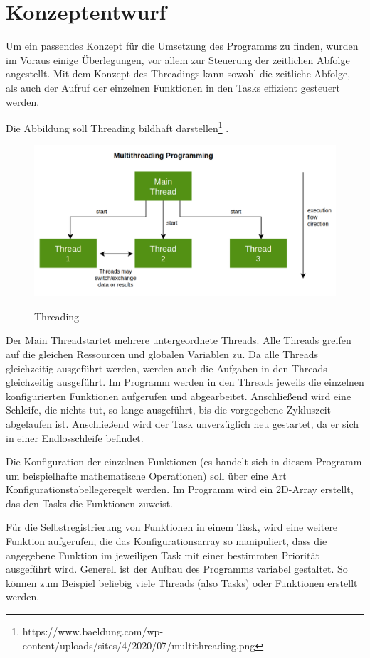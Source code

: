 \chapter{Konzeptentwurf}
\label{cha:Konzeptentwurf}

Um ein passendes Konzept für die Umsetzung des Programms zu finden, wurden im Voraus einige Überlegungen, vor allem zur Steuerung der zeitlichen Abfolge angestellt.
Mit dem Konzept des Threadings kann sowohl die zeitliche Abfolge, als auch der Aufruf der einzelnen Funktionen in den Tasks effizient gesteuert werden. 

Die Abbildung  soll Threading bildhaft darstellen\footnote[1]{https://www.baeldung.com/wp-content/uploads/sites/4/2020/07/multithreading.png}	.

\begin{figure}[hbt]				%
	\centering						%
	\includegraphics[width=0.6\linewidth]{images/multithreading}	
	\label{fig:multithreading}
	\caption{Threading}
	{\raggedright
	 }
	
\end{figure}

Der \glqq Main Thread\grqq \space startet mehrere untergeordnete Threads. Alle Threads greifen auf die gleichen Ressourcen und globalen Variablen zu. 
Da alle Threads gleichzeitig ausgeführt werden, werden auch die Aufgaben in den Threads gleichzeitig ausgeführt.  
Im Programm werden in den Threads jeweils die einzelnen konfigurierten Funktionen aufgerufen und abgearbeitet. Anschließend wird eine Schleife, die nichts tut, so lange ausgeführt, bis die vorgegebene Zykluszeit abgelaufen ist. Anschließend wird der Task unverzüglich neu gestartet, da er sich in einer Endlosschleife befindet. 

Die Konfiguration der einzelnen Funktionen (es handelt sich in diesem Programm um beispielhafte mathematische Operationen) soll über eine Art \glqq Konfigurationstabelle\grqq\space geregelt werden. Im Programm wird ein 2D-Array erstellt, das den Tasks die Funktionen zuweist. 

Für die Selbstregistrierung von Funktionen in einem Task, wird eine weitere Funktion aufgerufen, die das Konfigurationsarray so manipuliert, dass die angegebene Funktion im jeweiligen Task mit einer bestimmten Priorität ausgeführt wird. 
Generell ist der Aufbau des Programms variabel gestaltet. So können zum Beispiel beliebig viele Threads (also Tasks) oder Funktionen erstellt werden. 